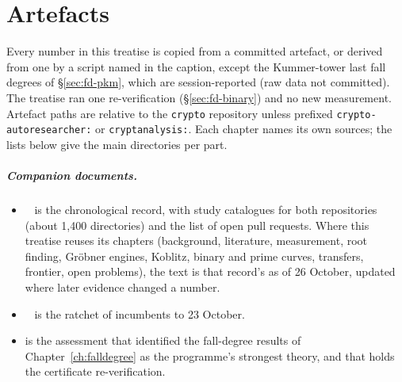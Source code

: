 \chapter{Artefacts}\label{app:artefacts}

Every number in this treatise is copied from a committed artefact, or
derived from one by a script named in the caption, except the
Kummer-tower last fall degrees of \S\ref{sec:fd-pkm}, which are
session-reported (raw data not committed). The treatise ran one
re-verification (\S\ref{sec:fd-binary}) and no new measurement. Artefact
paths are relative to the \texttt{crypto} repository unless prefixed
\texttt{crypto-autoresearcher:} or \texttt{cryptanalysis:}. Each chapter
names its own sources; the lists below give the main directories per
part.

\paragraph{Companion documents.}
\begin{itemize}
\item {}~\cite{icprogram2026} is
  the chronological record, with study catalogues for both repositories
  (about 1{,}400 directories) and the list of open pull requests. Where this
  treatise reuses its chapters (background, literature, measurement, root
  finding, Gröbner engines, Koblitz, binary and prime curves, transfers,
  frontier, open problems), the text is that record's as of 26 October,
  updated where later evidence changed a number.
\item {}~\cite{icledger2026} is the
  ratchet of incumbents to 23 October.
\item {} is the assessment that
  identified the fall-degree results of Chapter~\ref{ch:falldegree} as the
  programme's strongest theory, and that holds the certificate
  re-verification.
\end{itemize}


